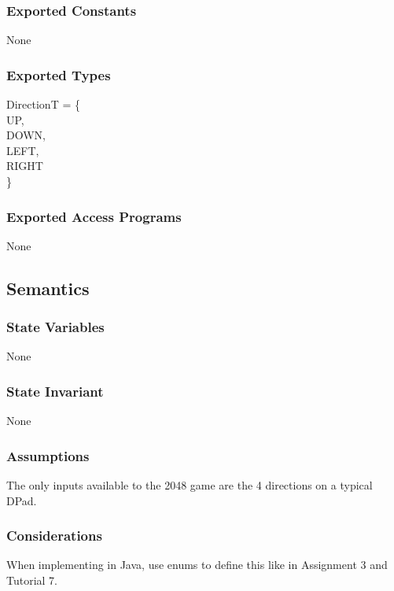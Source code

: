 \documentclass[12pt]{article}
\begin{document}
\subsubsection* {Exported Constants}

None

\subsubsection* {Exported Types}

DirectionT = \{\\
UP, \\
DOWN, \\
LEFT, \\
RIGHT\\
\}

\subsubsection* {Exported Access Programs}

None

\subsection* {Semantics}

\subsubsection* {State Variables}

None

\subsubsection* {State Invariant}

None

\subsubsection* {Assumptions}

The only inputs available to the 2048 game are the 4 directions on a typical DPad.

\subsubsection* {Considerations}

When implementing in Java, use enums to define this like in Assignment 3 and Tutorial 7.
\end{document}
